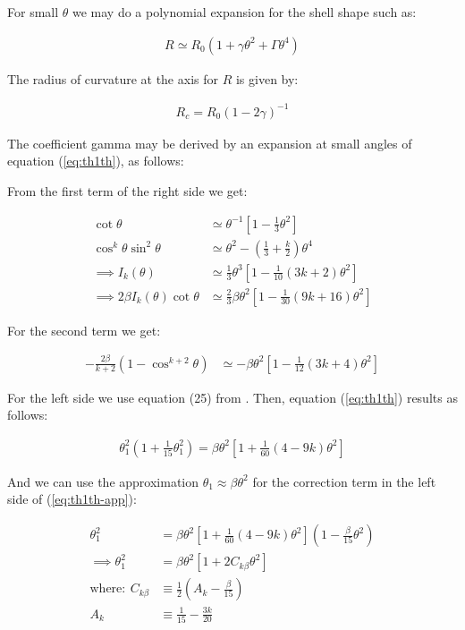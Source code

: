 For small $\theta$ we may do a polynomial expansion for the shell shape such as:

\begin{align}
R \simeq R_0\left(1+\gamma\theta^2 + \Gamma\theta^4\right) \label{eq:R-exp}
\end{align}

The radius of curvature at the axis for $R$ is given by:

\begin{align}
R_c = R_0\left(1-2\gamma\right)^{-1}
\end{align}

The coefficient gamma may be derived by an expansion at small angles of equation
(\ref{eq:th1th}), as follows:

From the first term of the right side we get:

\begin{align}
\cot\theta &\simeq \theta^{-1}\left[1-\frac{1}{3}\theta^2\right] \\
\cos^k\theta\sin^2\theta &\simeq \theta^2 - \left(\frac{1}{3} + \frac{k}{2}\right)\theta^4 \\
\implies I_k(\theta) &\simeq \frac{1}{3}\theta^3\left[ 1 - \frac{1}{10}(3k+2)\theta^2\right]\\
\implies 2\beta I_k(\theta)\cot\theta &\simeq \frac{2}{3}\beta\theta^2\left[1-\frac{1}{30}
(9k+16)\theta^2\right]\label{eq:AR1} 
\end{align}

For the second term we get:

\begin{align}
-\frac{2\beta}{k+2}\left(1-\cos^{k+2}\theta\right) & \simeq -\beta\theta^2\left[1-\frac{1}{12}
(3k+4)\theta^2\right] \label{eq:AR2}
\end{align}

For the left side we use equation (25) from \CRW{}. Then, equation (\ref{eq:th1th}) results
as follows:

\begin{align}
\theta_1^2\left(1+\frac{1}{15}\theta_1^2\right) = \beta\theta^2\left[1+\frac{1}{60}(4-9k)
\theta^2\right] \label{eq:th1th-app}
\end{align}

And we can use the approximation $\theta_1 \approx \beta\theta^2$ for the correction term in
the left side of (\ref{eq:th1th-app}):

\begin{align}
\theta_1^2 &= \beta\theta^2\left[1+\frac{1}{60}(4-9k)\theta^2\right]
\left(1-\frac{\beta}{15}\theta^2\right) \\
\implies \theta_1^2 &= \beta\theta^2\left[1+ 2C_{k\beta}\theta^2\right]
\label{eq:th1th-small}\\
\mathrm{where:~} C_{k\beta} &\equiv \frac{1}{2}\left(A_k-\frac{\beta}{15}\right) \\
A_k &\equiv \frac{1}{15}-\frac{3k}{20}
\end{align}

